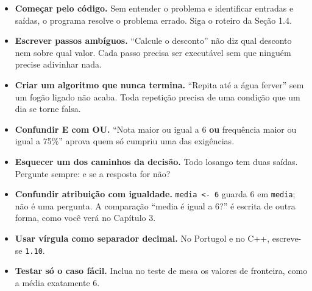 \begin{itemize}
  \item \textbf{Começar pelo código.} Sem entender o problema e identificar entradas e saídas, o programa resolve o problema errado. Siga o roteiro da Seção 1.4.
  \item \textbf{Escrever passos ambíguos.} ``Calcule o desconto'' não diz qual desconto nem sobre qual valor. Cada passo precisa ser executável sem que ninguém precise adivinhar nada.
  \item \textbf{Criar um algoritmo que nunca termina.} ``Repita até a água ferver'' sem um fogão ligado não acaba. Toda repetição precisa de uma condição que um dia se torne falsa.
  \item \textbf{Confundir E com OU.} ``Nota maior ou igual a 6 \textbf{ou} frequência maior ou igual a 75\%'' aprova quem só cumpriu uma das exigências.
  \item \textbf{Esquecer um dos caminhos da decisão.} Todo losango tem duas saídas. Pergunte sempre: e se a resposta for não?
  \item \textbf{Confundir atribuição com igualdade.} \texttt{media <- 6} guarda 6 em \texttt{media}; não é uma pergunta. A comparação ``media é igual a 6?'' é escrita de outra forma, como você verá no Capítulo 3.
  \item \textbf{Usar vírgula como separador decimal.} No Portugol e no C++, escreve-se \texttt{1.10}.
  \item \textbf{Testar só o caso fácil.} Inclua no teste de mesa os valores de fronteira, como a média exatamente 6.
\end{itemize}
